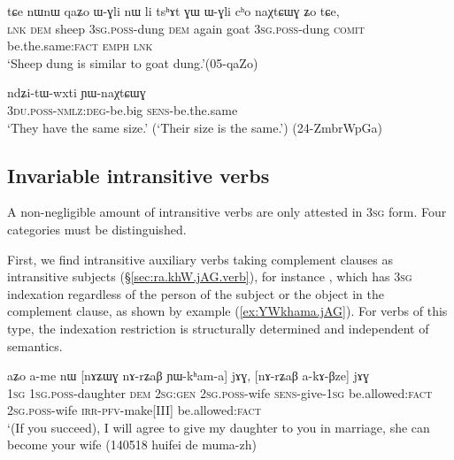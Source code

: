\begin{exe}
\ex   \label{ex:WGli.cho.naXtCWG}
 \gll   tɕe nɯnɯ qaʑo ɯ-ɣli nɯ li tsʰɤt ɣɯ ɯ-ɣli cʰo naχtɕɯɣ ʑo tɕe, \\
\textsc{lnk} \textsc{dem} sheep \textsc{3sg}.\textsc{poss}-dung \textsc{dem} again goat \textsc{3sg}.\textsc{poss}-dung \textsc{comit} be.the.same:\textsc{fact} \textsc{emph} \textsc{lnk} \\
\glt `Sheep dung is similar to goat dung.'(05-qaZo)
  \end{exe}

\begin{exe}
\ex   \label{ex:ndZitWwxti.YWnaXtCWG}
\gll  ndʑi-tɯ-wxti ɲɯ-naχtɕɯɣ \\
\textsc{3du}.\textsc{poss}-\textsc{nmlz}:\textsc{deg}-be.big \textsc{sens}-be.the.same \\
\glt `They have the same size.' (`Their size is the same.') (24-ZmbrWpGa) 
\end{exe}

\subsection{Invariable intransitive verbs} \label{sec:intransitive.invariable}
   
A non-negligible amount of intransitive verbs are only attested in \textsc{3sg} form. Four categories must be distinguished. 

First, we find intransitive auxiliary verbs taking complement clauses as intransitive subjects (§\ref{sec:ra.khW.jAG.verb}), for instance , which has \textsc{3sg} indexation regardless of the person of the subject or the object in the complement clause, as shown by example (\ref{ex:YWkhama.jAG}). For verbs of this type, the indexation restriction is structurally determined and independent of semantics.

\begin{exe}
\ex   \label{ex:YWkhama.jAG}
\gll aʑo a-me nɯ [nɤʑɯɣ nɤ-rʑaβ ɲɯ-kʰam-a] jɤɣ, [nɤ-rʑaβ a-kɤ-βze] jɤɣ \\
\textsc{1sg} \textsc{1sg}.\textsc{poss}-daughter \textsc{dem} \textsc{2sg}:\textsc{gen} \textsc{2sg}.\textsc{poss}-wife \textsc{sens}-give-\textsc{1sg} be.allowed:\textsc{fact} \textsc{2sg}.\textsc{poss}-wife \textsc{irr}-\textsc{pfv}-make[III] be.allowed:\textsc{fact} \\
\glt `(If you succeed), I will agree to give my daughter to you in marriage, she can become your wife (140518 huifei de muma-zh)
\end{exe}

